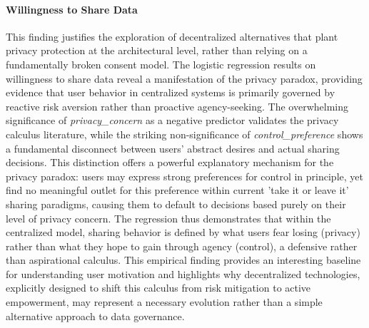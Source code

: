 	\paragraph{Willingness to Share Data}
	This finding justifies the exploration of decentralized alternatives that plant privacy protection at the architectural level, rather than relying on a fundamentally broken consent model. The logistic regression results on willingness to share data reveal a manifestation of the privacy paradox, providing evidence that user behavior in centralized systems is primarily governed by reactive risk aversion rather than proactive agency-seeking. The overwhelming significance of \textit{privacy\_concern} as a negative predictor validates the privacy calculus literature, while the striking non-significance of \textit{control\_preference} shows a fundamental disconnect between users' abstract desires and actual sharing decisions. This distinction offers a powerful explanatory mechanism for the privacy paradox: users may express strong preferences for control in principle, yet find no meaningful outlet for this preference within current 'take it or leave it' sharing paradigms, causing them to default to decisions based purely on their level of privacy concern. The regression thus demonstrates that within the centralized model, sharing behavior is defined by what users fear losing (privacy) rather than what they hope to gain through agency (control), a defensive rather than aspirational calculus. This empirical finding provides an interesting baseline for understanding user motivation and highlights why decentralized technologies, explicitly designed to shift this calculus from risk mitigation to active empowerment, may represent a necessary evolution rather than a simple alternative approach to data governance.
	

